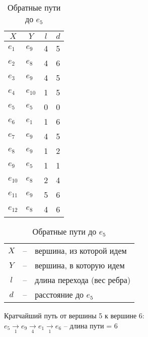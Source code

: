 \documentclass[a4paper,12pt]{article}
\begin{document}
\begin{table}[H]
    \centering
    \caption{Обратные пути до $e_5$}
    \begin{tabular}{l|l|c|c}
        \multicolumn{1}{c|}{$X$}&
        \multicolumn{1}{|c|}{$Y$}&
        $l$&$d$\\
        \hline
        $e_{1}$&$e_{9}$&4&5\\
        $e_{2}$&$e_{8}$&4&6\\
        $e_{3}$&$e_{9}$&4&5\\
        $e_{4}$&$e_{10}$&1&5\\
        $e_{5}$&$e_{5}$&0&0\\
        \hline
        $e_{6}$&$e_{1}$&1&6\\
        $e_{7}$&$e_{9}$&4&5\\
        $e_{8}$&$e_{9}$&1&2\\
        $e_{9}$&$e_{5}$&1&1\\
        \hline
        $e_{10}$&$e_{8}$&2&4\\
        $e_{11}$&$e_{9}$&5&6\\
        $e_{12}$&$e_{8}$&4&6\\
    \end{tabular}
    \begin{tabular}{ccl}
        $X$&--&вершина, из которой идем \\
        $Y$&--&вершина, в которую идем \\
        $l$&--&длина перехода (вес ребра) \\
        $d$&--&расстояние до $e_5$ \\
    \end{tabular}
\end{table}

\begin{table}[H]
    \noindent
    Кратчайший путь от вершины 5 к вершине 6: \\
    $e_{5}\xrightarrow[1]{} e_{9}\xrightarrow[4]{} e_{1}\xrightarrow[1]{} e_{6}$ -- длина пути = 6
\end{table}
\end{document}
